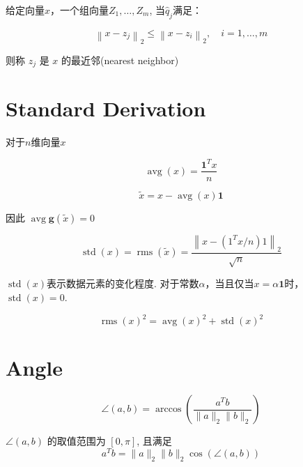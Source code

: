 \begin{definition}
    给定向量$x$，一个组向量$ Z_{1}, \ldots, Z_{m} $, 当$ \hat{q}_{j} $满足：

    $$ \left\|x-z_{j}\right\|_{2} \leq\left\|x-z_{i}\right\|_{2}, \quad i=1, \ldots, m $$

    则称 $ z_{j} $ 是 $ x $ 的最近邻(nearest neighbor)
\end{definition}

\section{Standard Derivation}

\begin{definition}[算术平均值]
    对于$n$维向量$x$

    $$ \operatorname{avg}(x)=\frac{\mathbf{1}^{T} x}{n} $$
\end{definition}

\begin{definition}
    $$ \tilde{x}=x-\operatorname{avg}(x) \mathbf{1} $$

    因此 $ \operatorname{avg} \boldsymbol{g}(\tilde{x})=0 $
\end{definition}

\begin{definition}[$x$的标准差]
    $$ \operatorname{std}(x)=\operatorname{rms}(\tilde{x})=\frac{\left\|x-\left(1^{T} x / n\right) 1\right\|_{2}}{\sqrt{n}} $$
\end{definition}

$\operatorname{std}(x)$表示数据元素的变化程度. 对于常数$\alpha$，当且仅当$ x=\alpha \mathbf{1} $时，$ \operatorname{std}(x)=0 $.

\begin{theorem}
    $$ \operatorname{rms}(x)^{2}=\operatorname{avg}(x)^{2}+\operatorname{std}(x)^{2} $$
\end{theorem}

\section{Angle}

\begin{definition}
    $$ \angle(a, b)=\arccos \left(\frac{a^{T} b}{\|a\|_{2}\|b\|_{2}}\right) $$

    $ \angle(a, b) $ 的取值范围为 $ [0, \pi] $, 且满足$$ a^{T} b=\|a\|_{2}\|b\|_{2} \cos (\angle(a, b)) $$
\end{definition}


